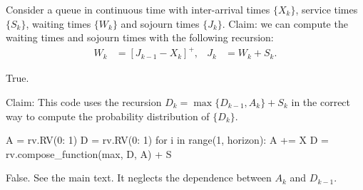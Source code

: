 \documentclass[stochastic-or.tex]{subfiles}
\begin{document}
\begin{truefalse}
Consider a  queue in continuous time with inter-arrival times $\{X_k\}$, service times $\{S_k\}$, waiting times $\{W_k\}$ and sojourn times $\{J_k\}$. Claim: we can compute the waiting times and sojourn times with the following recursion:
\begin{align*}
 W_{k} &= [J_{k-1} - X_k]^+, &
 J_{k} &= W_{k} + S_k.
\end{align*}
\begin{solution}
True.
\end{solution}
\end{truefalse}



\begin{truefalse}
Claim: This code  uses the recursion $D_{k} = \max\{D_{k-1}, A_{k}\} + S_{k}$ in the correct way to compute the probability distribution of $\{D_{k}\}$.
\begin{python}
A = rv.RV({0: 1})
D = rv.RV({0: 1})
for i in range(1, horizon):
    A += X
    D = rv.compose_function(max, D, A) + S
\end{python}
\begin{solution}
False. See the main text. It neglects the dependence between $A_{k}$ and $D_{k-1}$.
\end{solution}
\end{truefalse}



\end{document}
